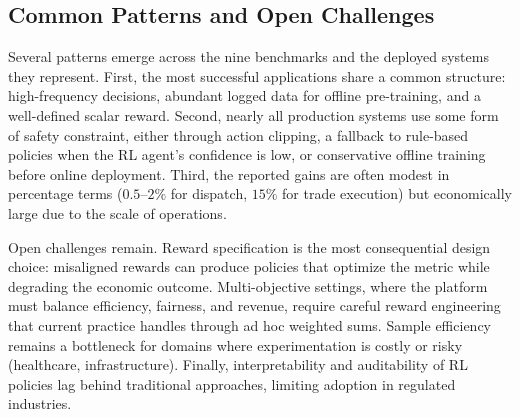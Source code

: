 \subsection{Common Patterns and Open Challenges}
\label{sec:benchmark_patterns}

Several patterns emerge across the nine benchmarks and the deployed systems they represent. First, the most successful applications share a common structure: high-frequency decisions, abundant logged data for offline pre-training, and a well-defined scalar reward. Second, nearly all production systems use some form of safety constraint, either through action clipping, a fallback to rule-based policies when the RL agent's confidence is low, or conservative offline training before online deployment. Third, the reported gains are often modest in percentage terms ($0.5$--$2\%$ for dispatch, $15\%$ for trade execution) but economically large due to the scale of operations.

Open challenges remain. Reward specification is the most consequential design choice: misaligned rewards can produce policies that optimize the metric while degrading the economic outcome. Multi-objective settings, where the platform must balance efficiency, fairness, and revenue, require careful reward engineering that current practice handles through ad hoc weighted sums. Sample efficiency remains a bottleneck for domains where experimentation is costly or risky (healthcare, infrastructure). Finally, interpretability and auditability of RL policies lag behind traditional approaches, limiting adoption in regulated industries.
